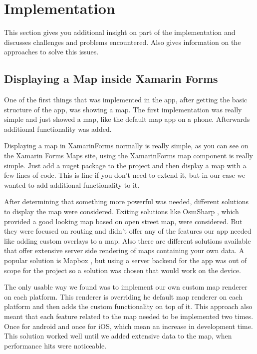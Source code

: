 \section{Implementation}
This section gives you additional insight on part of the implementation and discusses challenges and problems encountered. Also gives information on the approaches to solve this issues.

\subsection{Displaying a Map inside Xamarin Forms}
One of the first things that was implemented in the app, after getting the basic structure of the app, was showing a map. The first implementation was really simple and just showed a map, like the default map app on a phone. Afterwards additional functionality was added.

Displaying a map in \gls{XamarinForms} normally is really simple, as you can see on the Xamarin Forms Maps \cite{xamMaps} site, using the \gls{XamarinForms} map component is really simple. Just add a \gls{nuget} package to the project and then display a map with a few lines of code. This is fine if you don't need to extend it, but in our case we wanted to add additional functionality to it.

After determining that something more powerful was needed, different solutions to display the map were considered. Exiting solutions like 
OsmSharp \cite{osmsharp}, which provided a good looking map based on open street map, were considered. But they were focused on routing and didn't offer any of the features our app needed like adding custom \glspl{overlay} to a map.
Also there are different solutions available that offer extensive server side rendering of maps containing your own data. A popular solution is Mapbox \cite{mapbox}, but using a server backend for the app was out of scope for the project so a solution was chosen that would work on the device.

The only usable way we found was to implement our own custom map \gls{renderer} on each platform. This \gls{renderer} is overriding he default map \gls{renderer} on each platform and then adds the custom functionality on top of it. This approach also meant that each feature related to the map needed to be implemented two times. Once for android and once for iOS, which mean an increase in development time. This solution worked well until we added extensive data to the map, when performance hits were noticeable.

